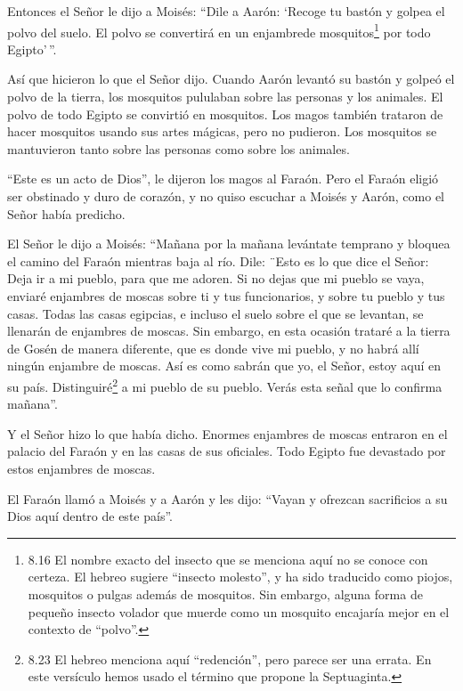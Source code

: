  Entonces el Señor le dijo a Moisés: ``Dile a Aarón:
`Recoge tu bastón y golpea el polvo del suelo. El polvo se convertirá en
un enjambrede mosquitos\footnote{8.16 El nombre exacto del insecto que
  se menciona aquí no se conoce con certeza. El hebreo sugiere ``insecto
  molesto'', y ha sido traducido como piojos, mosquitos o pulgas además
  de mosquitos. Sin embargo, alguna forma de pequeño insecto volador que
  muerde como un mosquito encajaría mejor en el contexto de ``polvo''.}
por todo Egipto'\,''.

 Así que hicieron lo que el Señor dijo. Cuando Aarón
levantó su bastón y golpeó el polvo de la tierra, los mosquitos
pululaban sobre las personas y los animales. El polvo de todo Egipto se
convirtió en mosquitos.  Los magos también trataron de
hacer mosquitos usando sus artes mágicas, pero no pudieron. Los
mosquitos se mantuvieron tanto sobre las personas como sobre los
animales.

 ``Este es un acto de Dios'', le dijeron los magos al
Faraón. Pero el Faraón eligió ser obstinado y duro de corazón, y no
quiso escuchar a Moisés y Aarón, como el Señor había predicho.

 El Señor le dijo a Moisés: ``Mañana por la mañana
levántate temprano y bloquea el camino del Faraón mientras baja al río.
Dile: ¨Esto es lo que dice el Señor: Deja ir a mi pueblo, para que me
adoren.  Si no dejas que mi pueblo se vaya, enviaré
enjambres de moscas sobre ti y tus funcionarios, y sobre tu pueblo y tus
casas. Todas las casas egipcias, e incluso el suelo sobre el que se
levantan, se llenarán de enjambres de moscas.  Sin embargo,
en esta ocasión trataré a la tierra de Gosén de manera diferente, que es
donde vive mi pueblo, y no habrá allí ningún enjambre de moscas. Así es
como sabrán que yo, el Señor, estoy aquí en su país. 
Distinguiré\footnote{8.23 El hebreo menciona aquí ``redención'', pero
  parece ser una errata. En este versículo hemos usado el término que
  propone la Septuaginta.} a mi pueblo de su pueblo. Verás esta señal
que lo confirma mañana''.

 Y el Señor hizo lo que había dicho. Enormes enjambres de
moscas entraron en el palacio del Faraón y en las casas de sus
oficiales. Todo Egipto fue devastado por estos enjambres de moscas.

 El Faraón llamó a Moisés y a Aarón y les dijo: ``Vayan y
ofrezcan sacrificios a su Dios aquí dentro de este país''.

